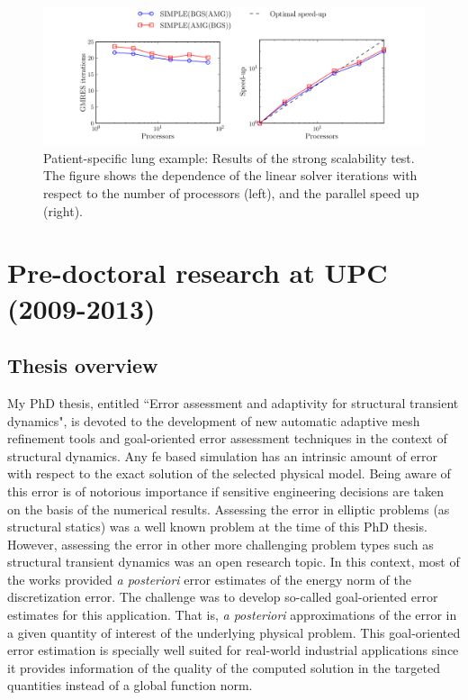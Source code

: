 \documentclass{article}
\newcommand{\bemph}[1]{#1}
\begin{document}
\begin{figure}[ht!]
\includegraphics[width=\textwidth]{../_assets/fig16.png}
\caption{Patient-specific lung example: Results of the strong scalability test. The figure shows the dependence of the linear solver iterations with respect to the number of processors (left), and the parallel speed up (right).}
\label{fig:medium-lung-scal}
\end{figure}

 
\section{Pre-doctoral research at UPC (2009-2013)}\label{sec:upc}

\subsection{Thesis overview}

My PhD thesis, entitled ``Error assessment and adaptivity for structural transient dynamics", is devoted to the development of new automatic adaptive mesh refinement tools and goal-oriented error assessment techniques in the context of structural dynamics. Any \ac{fe} based simulation has an intrinsic amount of error with respect to the exact solution of the selected physical model. Being aware of this error is of notorious importance if sensitive engineering decisions are taken on the basis of the numerical results. Assessing the error in elliptic problems (as structural statics) was a well known problem at the time of this PhD thesis. However, assessing the error in other more challenging problem types such as structural transient dynamics was an open research topic. In this context, most of the works provided \emph{a posteriori} error estimates of the energy norm of the discretization error. The challenge was to develop so-called \bemph{goal-oriented} error estimates for this application. That is, \emph{a posteriori} approximations of the error in a given \bemph{quantity of interest} of the underlying physical problem. This goal-oriented error estimation is specially well suited for real-world industrial applications since it provides information of the quality of the computed solution in the targeted quantities instead of a global function norm. 
\end{document}
